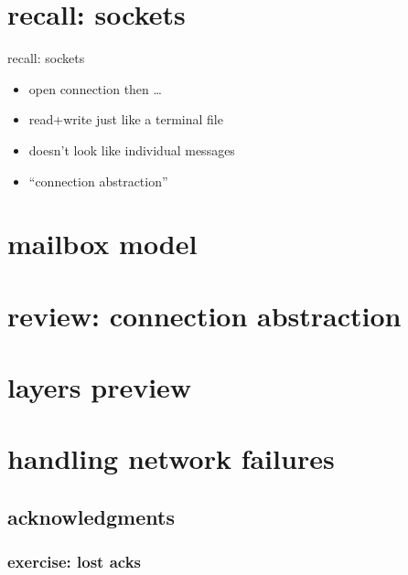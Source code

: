 

\section{recall: sockets}

\begin{frame}{recall: sockets}
    \begin{itemize}
    \item open connection then \ldots \\
    \item read+write just like a terminal file
    \vspace{.5cm}
    \item doesn't look like individual messages
    \item ``connection abstraction''
    \end{itemize}
\end{frame}

\section{mailbox model}


\section{review: connection abstraction}



\section{layers preview}


\section{handling network failures}


\subsection{acknowledgments}

\subsubsection{exercise: lost acks}


